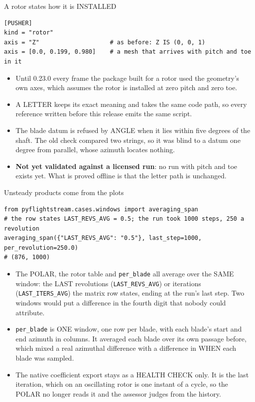 \documentclass[aspectratio=169,10pt]{beamer}
\newcommand{\code}[1]{\texttt{\small #1}}
\begin{document}
\begin{frame}[fragile]{A rotor states how it is INSTALLED}
\begin{lstlisting}
[PUSHER]
kind = "rotor"
axis = "Z"                    # as before: Z IS (0, 0, 1)
axis = [0.0, 0.199, 0.980]    # a mesh that arrives with pitch and toe in it
\end{lstlisting}
  \begin{itemize}
    \item Until 0.23.0 every frame the package built for a rotor used the geometry's own axes, which assumes the rotor is installed at zero pitch and zero toe.
    \item A LETTER keeps its exact meaning and takes the same code path, so every reference written before this release emits the same script.
    \item The blade datum is refused by ANGLE when it lies within five degrees of the shaft. The old check compared two strings, so it was blind to a datum one degree from parallel, whose azimuth locates nothing.
    \item \textbf{Not yet validated against a licensed run}: no run with pitch and toe exists yet. What is proved offline is that the letter path is unchanged.
  \end{itemize}
\end{frame}

\begin{frame}[fragile]{Unsteady products come from the plots}
\begin{lstlisting}
from pyflightstream.cases.windows import averaging_span
# the row states LAST_REVS_AVG = 0.5; the run took 1000 steps, 250 a revolution
averaging_span({"LAST_REVS_AVG": "0.5"}, last_step=1000, per_revolution=250.0)
# (876, 1000)
\end{lstlisting}
  \begin{itemize}
    \item The POLAR, the rotor table and \code{per\_blade} all average over the SAME window: the LAST revolutions (\code{LAST\_REVS\_AVG}) or iterations (\code{LAST\_ITERS\_AVG}) the matrix row states, ending at the run's last step. Two windows would put a difference in the fourth digit that nobody could attribute.
    \item \code{per\_blade} is ONE window, one row per blade, with each blade's start and end azimuth in columns. It averaged each blade over its own passage before, which mixed a real azimuthal difference with a difference in WHEN each blade was sampled.
    \item The native coefficient export stays as a HEALTH CHECK only. It is the last iteration, which on an oscillating rotor is one instant of a cycle, so the POLAR no longer reads it and the assessor judges from the history.
  \end{itemize}
\end{frame}
\end{document}

